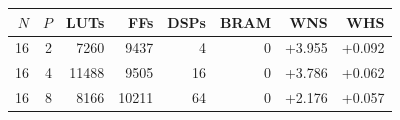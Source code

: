 \begin{tabular}{rrrrrrrr}
\toprule
$N$ & $P$ & LUTs & FFs & DSPs & BRAM & WNS & WHS\\
\midrule
16 & 2 & 7260 & 9437 & 4 & 0 & +3.955 & +0.092\\
16 & 4 & 11488 & 9505 & 16 & 0 & +3.786 & +0.062\\
16 & 8 & 8166 & 10211 & 64 & 0 & +2.176 & +0.057\\
\bottomrule
\end{tabular}
